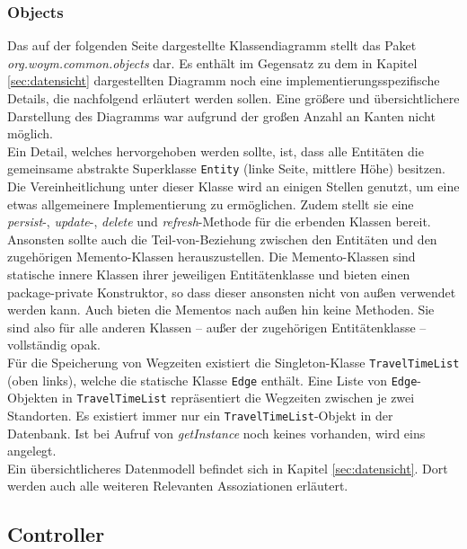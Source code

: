 \documentclass[fontsize=12pt,paper=a4,twoside]{scrartcl}
\begin{document}
\subsubsection{Objects}
\label{subsubsec:Objects}
Das auf der folgenden Seite dargestellte Klassendiagramm stellt das Paket \textit{org.woym.common.objects} dar. Es enthält im Gegensatz zu dem in Kapitel \ref{sec:datensicht} dargestellten Diagramm noch eine implementierungsspezifische Details, die nachfolgend erläutert werden sollen. Eine größere und übersichtlichere Darstellung des Diagramms war aufgrund der großen Anzahl an Kanten nicht möglich.\\
Ein Detail, welches hervorgehoben werden sollte, ist, dass alle Entitäten die gemeinsame abstrakte Superklasse \texttt{Entity} (linke Seite, mittlere Höhe) besitzen. Die Vereinheitlichung unter dieser Klasse wird an einigen Stellen genutzt, um eine etwas allgemeinere Implementierung zu ermöglichen. Zudem stellt sie eine \textit{persist}-, \textit{update}-, \textit{delete} und \textit{refresh}-Methode für die erbenden Klassen bereit.\\
Ansonsten sollte auch die Teil-von-Beziehung zwischen den Entitäten und den zugehörigen Memento-Klassen herauszustellen. Die Memento-Klassen sind statische innere Klassen ihrer jeweiligen Entitätenklasse und bieten einen package-private Konstruktor, so dass dieser ansonsten nicht von außen verwendet werden kann. Auch bieten die Mementos nach außen hin keine Methoden. Sie sind also für alle anderen Klassen -- außer der zugehörigen Entitätenklasse -- vollständig opak.\\
Für die Speicherung von Wegzeiten existiert die Singleton-Klasse \texttt{TravelTimeList} (oben links), welche die statische Klasse \texttt{Edge} enthält. Eine Liste von \texttt{Edge}-Objekten in \texttt{TravelTimeList} repräsentiert die Wegzeiten zwischen je zwei Standorten. Es existiert immer nur ein \texttt{TravelTimeList}-Objekt in der Datenbank. Ist bei Aufruf von \textit{getInstance} noch keines vorhanden, wird eins angelegt.\\
Ein übersichtlicheres Datenmodell befindet sich in Kapitel \ref{sec:datensicht}. Dort werden auch alle weiteren Relevanten Assoziationen erläutert.




\subsection{Controller}
\label{subsec:Controller}
\end{document}
